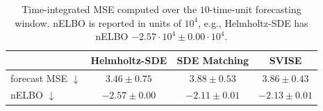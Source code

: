 \begin{table}[!h]
\centering
\setlength{\tabcolsep}{3pt}
\begin{tabular}{lccc}
\toprule
& Helmholtz-SDE & SDE Matching & SVISE \\
\midrule
forecast MSE $\downarrow$ & $\mathbf{3.46 \pm 0.75}$ & $\mathbf{3.88 \pm 0.53}$ & $\mathbf{3.86 \pm 0.43}$\\
nELBO $\downarrow$ & $\mathbf{-2.57 \pm 0.00}$ & $-2.11 \pm 0.01$ & $-2.13 \pm 0.01$\\
\bottomrule
\end{tabular}
\vspace{0.5em}
\caption{Time-integrated MSE computed over the $10$-time-unit forecasting window. nELBO is reported in units of $10^4$, e.g., Helmholtz-SDE has nELBO $-2.57 \cdot 10^4 \pm 0.00 \cdot 10^4$.}
\label{tab:rom-mse}
\vspace{-1em}
\end{table}